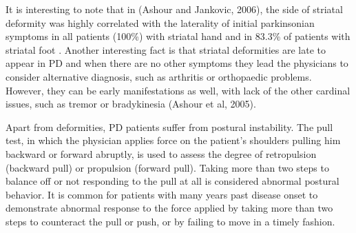 It is interesting to note that in (Ashour and Jankovic, 2006), the side of striatal deformity was highly correlated with the laterality of initial parkinsonian symptoms in all patients (100\%) with striatal hand and in 83.3\% of patients with striatal foot . Another interesting fact is that striatal deformities are late to appear in \gls{PD} and when there are no other symptoms they lead the physicians to consider alternative diagnosis, such as arthritis or orthopaedic problems. However, they can be early manifestations as well, with lack of the other cardinal issues, such as tremor or bradykinesia (Ashour et al, 2005).

Apart from deformities, \gls{PD} patients suffer from postural instability. The pull test, in which the physician applies force on the patient's shoulders pulling him backward or forward abruptly, is used to assess the degree of retropulsion (backward pull) or propulsion (forward pull). Taking more than two steps to balance off or not responding to the pull at all is considered abnormal postural behavior. It is common for patients with many years past disease onset to demonstrate abnormal response to the force applied by taking more than two steps to counteract the pull or push, or by failing to move in a timely fashion. 